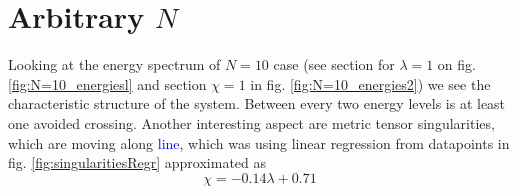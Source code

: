 \section{Arbitrary $N$}
Looking at the energy spectrum of $N=10$ case (see section for $\lambda=1$ on fig. \ref{fig:N=10_energiesl} and section $\chi=1$ in fig. \ref{fig:N=10_energies2}) we see the characteristic structure of the system. Between every two energy levels is at least one avoided crossing. Another interesting aspect are metric tensor singularities, which are moving along \textcolor{blue}{line}, which was using linear regression from datapoints in fig. \ref{fig:singularitiesRegr} approximated as 
\begin{equation}
    \chi=-0.14 \lambda + 0.71
    \label{eq:linearRegressionSingularities}
\end{equation}
 


